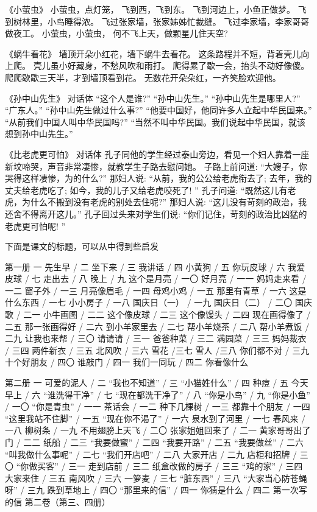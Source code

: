 《小萤虫》
小萤虫，点灯笼，
飞到西，飞到东。
飞到河边上，小鱼正做梦。
飞到树林里，小鸟睡得浓。
飞过张家墙，张家姊姊忙裁缝。
飞过李家墙，李家哥哥做夜工。
小萤虫，小萤虫，
何不飞上天，做颗星儿住天空?
 
《蜗牛看花》
墙顶开朵小红花，墙下蜗牛去看花。
这条路程并不短，背着壳儿向上爬。
壳儿虽小好藏身，不愁风吹和雨打。
爬得累了歇一会，抬头不动好像傻。
爬爬歇歇三天半，才到墙顶看到花。
无数花开朵朵红，一齐笑脸欢迎他。
 
《孙中山先生》 对话体
“这个人是谁?”
“孙中山先生。”
“孙中山先生是哪里人?”
“广东人。”
“孙中山先生做过什么事?”
“他要中国好，他同许多人立起中华民国来。”
“从前我们中国人叫中华民国吗?”
“当然不叫中华民国。我们说起中华民国，就该想到孙中山先生。”
 
《比老虎更可怕》 对话体
孔子同他的学生经过泰山旁边，看见一个妇人靠着一座新坟啼哭，声音非常凄惨，就教学生子路去慰问她。
子路上前问道: “大嫂子，你哭得这样凄惨，为的什么?”
那妇人说: “从前，我的公公给老虎衔去了; 去年，我的丈夫给老虎吃了; 如今，我的儿子又给老虎咬死了! ”
孔子问道: “既然这儿有老虎，为什么不搬到没有老虎的别处去住呢?”
那妇人说: “这儿没有苛刻的政治，我还舍不得离开这儿。”
孔子回过头来对学生们说: “你们记住，苛刻的政治比凶猛的老虎更可怕呢! ”
 
下面是课文的标题，可以从中得到些启发
 
第一册
一 先生早 / 二 坐下来 / 三 我讲话 / 四 小黄狗 / 五 你玩皮球 / 六 我爱皮球 / 七 走出去 / 八 晚上 / 九 这个是月亮 / 一〇 好月亮 / 一一 妈妈走来看 / 一二 窗子外 / 一三 月亮像眉毛 / 一四 母鸡小鸡 / 一五 那里有青草 / 一六 这是什么东西 / 一七 小小房子 / 一八 国庆日（一） / 一九 国庆日（二） / 二〇 国庆歌 / 二一 小牛画图 / 二二 这个像皮球 / 二三 这个像馒头 / 二四 现在画得像了 / 二五 那一张画得好 / 二六 到小羊家里去 / 二七 帮小羊烧茶 / 二八 帮小羊煮饭 / 二九 让我也来帮 / 三〇 请请请 / 三一 爸爸种菜 / 三二 满园菜 / 三三 妈妈裁衣 / 三四 两件新衣 / 三五 北风吹 / 三六 雪花 /三七 雪人 /三八 你们都不对 / 三九 十个好朋友 / 四〇 谁敲门 / 四一 我们一同玩 / 四二 你看像什么
 
第二册
一 可爱的泥人 / 二 “我也不知道” / 三 “小猫姓什么” / 四 种痘 / 五 今天早上 / 六 “谁洗得干净” / 七 “现在都洗干净了” / 八 “你是小鸟” / 九 “你是小鱼” / 一〇 “你是青虫” / 一一 茶话会 / 一二 种下几棵树 / 一三 都靠十个朋友 / 一四 “这里我站不住脚” / 一五 “现在你不渴了” / 一六 泉水到了河里 / 一七 春风来 / 一八 柳树条 / 一九 不用翅膀上天飞 / 二〇 张家姐姐回来了 / 二一 黄家哥哥出了门 / 二二 纸船 / 二三 “我要做蜜” / 二四 “我要开路” / 二五 “我要做丝” / 二六 “叫我做什么事呢” / 二七 “我们开店吧” / 二八 大家开店 / 二九 店柜和招牌 / 三〇 “你做买客” / 三一 走到店前 / 三二 纸盒改做的房子 / 三三 “鸡的家” / 三四 大家来住 / 三五 南风吹 / 三六 一箩麦 / 三七 “脏东西” / 三八 “大家当心防苍蝇呀” / 三九 跌到草地上 / 四〇 “那里来的信” / 四一 你猜是什么 / 四二 第一次写的信
第二卷（第三、四册）
 
